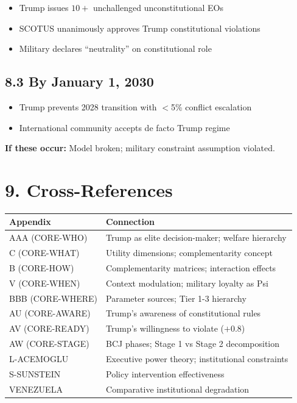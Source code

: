 \documentclass[11pt]{article}
\begin{document}
\begin{itemize}
\item[ ] Trump issues $10+$ unchallenged unconstitutional EOs
\item[ ] SCOTUS unanimously approves Trump constitutional violations
\item[ ] Military declares ``neutrality'' on constitutional role
\end{itemize}

\subsection{8.3 By January 1, 2030}

\begin{itemize}
\item[ ] Trump prevents 2028 transition with $<$5\% conflict escalation
\item[ ] International community accepts de facto Trump regime
\end{itemize}

\textbf{If these occur:} Model broken; military constraint assumption violated.

\section{9. Cross-References}

\begin{table}[h]
\centering
\begin{tabular}{|l|l|}
\hline
\textbf{Appendix} & \textbf{Connection} \\
\hline
AAA (CORE-WHO) & Trump as elite decision-maker; welfare hierarchy \\
C (CORE-WHAT) & Utility dimensions; complementarity concept \\
B (CORE-HOW) & Complementarity matrices; interaction effects \\
V (CORE-WHEN) & Context modulation; military loyalty as Psi \\
BBB (CORE-WHERE) & Parameter sources; Tier 1-3 hierarchy \\
AU (CORE-AWARE) & Trump's awareness of constitutional rules \\
AV (CORE-READY) & Trump's willingness to violate ($+0.8$) \\
AW (CORE-STAGE) & BCJ phases; Stage 1 vs Stage 2 decomposition \\
\hline
L-ACEMOGLU & Executive power theory; institutional constraints \\
S-SUNSTEIN & Policy intervention effectiveness \\
VENEZUELA & Comparative institutional degradation \\
\hline
\end{tabular}
\end{table}
\end{document}
